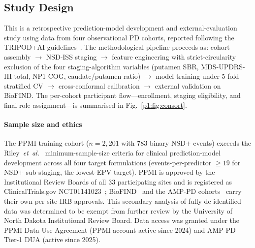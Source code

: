 \subsection{Study Design}
This is a retrospective prediction-model development and external-evaluation study using data from four observational PD cohorts, reported following the TRIPOD+AI guidelines~\cite{collins2024}. The methodological pipeline proceeds as: cohort assembly $\to$ NSD-ISS staging $\to$ feature engineering with strict-circularity exclusion of the four staging-algorithm variables (putamen SBR, MDS-UPDRS-III total, NP1-COG, caudate/putamen ratio) $\to$ model training under 5-fold stratified CV $\to$ cross-conformal calibration $\to$ external validation on BioFIND. The per-cohort participant flow---enrollment, staging eligibility, and final role assignment---is summarised in Fig.~\ref{p1:fig:consort}.

\paragraph*{Sample size and ethics} The PPMI training cohort ($n{=}2{,}201$ with 783 binary NSD$+$ events) exceeds the Riley~\textit{et~al.}~\cite{riley2020sampsize} minimum-sample-size criteria for clinical prediction-model development across all four target formulations (events-per-predictor $\geq 19$ for NSD$+$ sub-staging, the lowest-EPV target). PPMI is approved by the Institutional Review Boards of all 33 participating sites and is registered as ClinicalTrials.gov NCT01141023~\cite{marek2018ppmi}; BioFIND~\cite{russo2025} and the AMP-PD cohorts~\cite{biofind2025nsd} carry their own per-site IRB approvals. This secondary analysis of fully de-identified data was determined to be exempt from further review by the University of North Dakota Institutional Review Board. Data access was granted under the PPMI Data Use Agreement (PPMI account active since 2024) and AMP-PD Tier-1 DUA (active since 2025).

